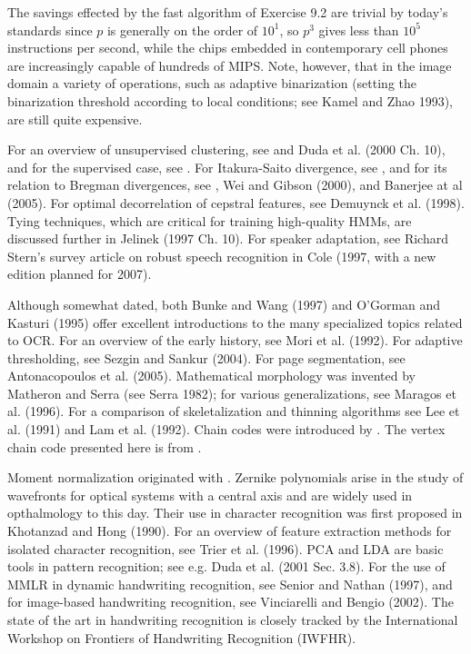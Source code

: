 The savings effected by the fast algorithm of Exercise 9.2 are trivial by
today's standards since $p$ is generally on the order of $10^1$, so $p^3$
gives less than $10^5$ instructions per second, while the chips embedded in
contemporary cell phones are increasingly capable of hundreds of MIPS. Note,
however, that in the image domain a variety of operations, such as adaptive
binarization (setting the binarization threshold according to local
conditions; see Kamel and Zhao 1993), are still quite
expensive.\nocite{Kamel:1993}

For an overview of unsupervised clustering, see  and
Duda et al. (2000 Ch. 10), and for the supervised case, see
. For Itakura-Saito divergence, see
, and for its relation to Bregman divergences, see
, Wei and Gibson (2000), and Banerjee at al
(2005).\nocite{Wei:2000}\nocite{Banerjee:2005} For optimal decorrelation of
cepstral features, see Demuynck et al.  (1998).\nocite{Demuynck:1998} Tying
techniques, which are critical for training high-quality HMMs, are discussed
further in Jelinek (1997 Ch. 10). For speaker adaptation, see Richard Stern's
survey article on robust speech recognition in Cole (1997, with a new edition
planned for 2007).\nocite{Cole:1997}

Although somewhat dated, both Bunke and Wang (1997)\nocite{Bunke:1997} and
O'Gorman and Kasturi (1995)\nocite{OGorman:1995} offer excellent introductions
to the many specialized topics related to OCR. For an overview of the early
history, see Mori et al. (1992).\nocite{Mori:1992} For adaptive thresholding,
see Sezgin and Sankur (2004).\nocite{Sezgin:2004} For page segmentation, see
Antonacopoulos et al. (2005).\nocite{Antonacopoulos:2005} Mathematical
morphology was invented by Matheron and Serra (see Serra 1982);
\nocite{Serra:1982} for various generalizations, see Maragos et
al. (1996). For a comparison of skeletalization and thinning algorithms see
Lee et al. (1991) and Lam et
al. (1992).\nocite{Lam:1992}\nocite{Lee:1991}\nocite{Maragos:1996} Chain codes
were introduced by . The vertex chain code presented
here is from .

Moment normalization originated with . Zernike polynomials
arise in the study of wavefronts for optical systems with a central axis
\cite{Zernike:1934} and are widely used in opthalmology to this day. Their use
in character recognition was first proposed in Khotanzad and Hong
(1990).\nocite{Khotanzad:1990} For an overview of feature extraction methods
for isolated character recognition, see Trier et
al. (1996).\nocite{Trier:1996} PCA and LDA are basic tools in pattern
recognition; see e.g. Duda et al. (2001 Sec. 3.8). For the use of MMLR in
dynamic handwriting recognition, see Senior and Nathan (1997), and for
image-based handwriting recognition, see Vinciarelli and Bengio
(2002).\nocite{Senior:1997}\nocite{Vinciarelli:2002} The state of the art in
handwriting recognition is closely tracked by the International Workshop on
Frontiers of Handwriting Recognition (IWFHR).

